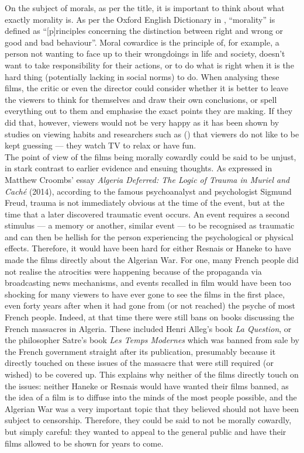 \documentclass[12pt]{article}
\begin{document}
On the subject of morals, as per the title, it is important to think
about what exactly morality is. As per the Oxford English Dictionary
in \citeyear{oed-morality}, ``morality'' is defined as ``[p]rinciples
concerning the distinction between right and wrong or good and bad
behaviour''. Moral cowardice is the principle of, for example, a
person not wanting to face up to their wrongdoings in life and
society, doesn't want to take responsibility for their actions, or to
do what is right when it is the hard thing (potentially lacking in
social norms) to do. When analysing these films, the critic or even
the director could consider whether it is better to leave the viewers
to think for themselves and draw their own conclusions, or spell
everything out to them and emphasise the exact points they are making.
If they did that, however, viewers would not be very happy as it has
been shown by studies on viewing habits and researchers such as
\citeauthor{film-cognition} (\citeyear{film-cognition}) that viewers
do not like to be kept guessing --- they watch TV to relax or have
fun.\\

The point of view of the films being morally cowardly could be said to
be unjust, in stark contrast to earlier evidence and ensuing thoughts.
As expressed in Matthew Croombs' essay \textit{Algeria Deferred: The
Logic of Trauma in Muriel and Caché} (2014), according to the famous
psychoanalyst and psychologist Sigmund Freud, trauma is not
immediately obvious at the time of the event, but at the time that a
later discovered traumatic event occurs. An event requires a second
stimulus --- a memory or another, similar event --- to be recognised
as traumatic and can then be hellish for the person experiencing the
psychological or physical effects. Therefore, it would have been hard
for either Resnais or Haneke to have made the films directly about the
Algerian War. For one, many French people did not realise the
atrocities were happening because of the propaganda via broadcasting
news mechanisms, and events recalled in film would have been too
shocking for many viewers to have ever gone to see the films in the
first place, even forty years after when it had gone from (or not
reached) the psyche of most French people. Indeed, at that time there
were still bans on books discussing the French massacres in Algeria.
These included Henri Alleg's book \textit{La Question}, or the
philosopher Satre's book \textit{Les Temps Modernes} which was banned
from sale by the French government straight after its publication,
presumably because it directly touched on these issues of the massacre
that were still required (or wished) to be covered up. This explains
why neither of the films directly touch on the issues: neither Haneke
or Resnais would have wanted their films banned, as the idea of a film
is to diffuse into the minds of the most people possible, and the
Algerian War was a very important topic that they believed should not
have been subject to censorship. Therefore, they could be said to not
be morally cowardly, but simply careful: they wanted to appeal to the
general public and have their films allowed to be shown for years to
come.\\
\end{document}

